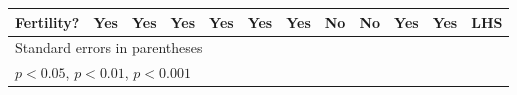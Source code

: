 \begin{table}[htbp]
\begin{tabular}{l*{11}{c}}
Fertility?      &      Yes         &      Yes         &      Yes         &      Yes         &      Yes         &      Yes         &       No         &       No         &      Yes         &      Yes         &      LHS         \\
\bottomrule
\multicolumn{12}{l}{\footnotesize Standard errors in parentheses}\\
\multicolumn{12}{l}{\footnotesize \sym{*} \(p<0.05\), \sym{**} \(p<0.01\), \sym{***} \(p<0.001\)}\\
\end{tabular}
\end{table}
